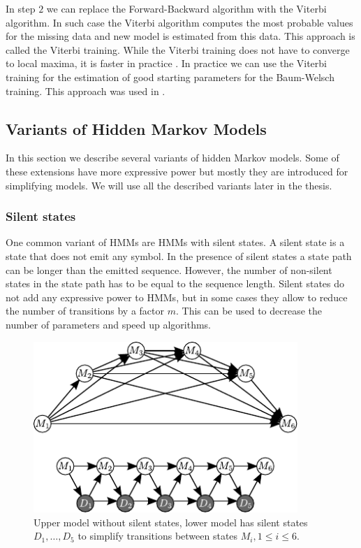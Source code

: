 In step $2$ we can replace the Forward-Backward algorithm with the Viterbi
algorithm. In such case the Viterbi algorithm computes the most probable values
for the missing data and new model is estimated from this data.
This approach is called the Viterbi training.  While the Viterbi training does
not have to converge to local maxima, it is faster in practice
\cite{Durbin1998}.  In practice we can use the Viterbi training for the
estimation of good starting parameters for the Baum-Welsch training. This
approach was used in \cite{FEAST2011}.

\subsection{Variants of Hidden Markov Models}

In this section we describe several variants of hidden Markov models.  Some of
these extensions have more expressive power but mostly they are introduced for
simplifying  models. We will use all the described variants later in the
thesis.

\subsubsection{Silent states}
\label{SECTION:SILENT}
One common variant of HMMs are HMMs with silent states. A silent state is a state
that does not emit any symbol. In the presence of silent states a state path can
be longer than the emitted sequence. However, the number of non-silent states in
the state path has to be equal to the sequence length. Silent states do not
add any expressive power to HMMs, but in some cases they allow to reduce the
number of transitions by a factor $m$. This can be used to decrease the number of
parameters and speed up algorithms. 

\begin{figure}
\begin{center}
\includegraphics[width=10cm]{../figures/silent_removal.pdf}
\end{center}
\caption[Removal of silent state]{
Upper model without silent states, lower model has silent states $D_1, \dots, D_5$ to simplify 
transitions between states $M_i, 1\leq i\leq 6$.
}\label{FIGURE:SILENTREMOVE}
\end{figure}

